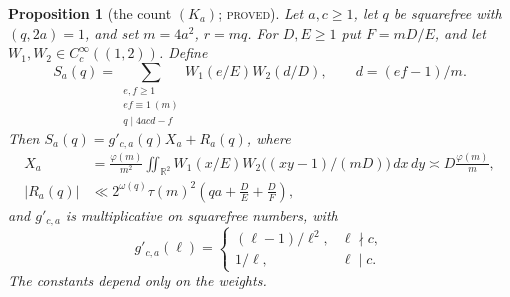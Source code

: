 \documentclass[10pt,reqno]{amsart}
\newtheorem{proposition}[theorem]{Proposition}
\theoremstyle{definition}
\numberwithin{equation}{section}
\newcommand{\R}{\mathbb R}
\newcommand{\status}[1]{\textup{\textsc{#1}}}
\begin{document}
\begin{proposition}[the count $(K_a)$; \status{proved}]\label{L:7.1}
Let $a,c\geq1$, let $q$ be squarefree with $(q,2a)=1$, and set
$m=4a^2$, $r=mq$.  For $D,E\geq1$ put $F=mD/E$, and let
$W_1,W_2\in C_c^\infty((1,2))$.  Define
\[
 S_a(q)=\sum_{\substack{e,f\geq1\\ef\equiv1\ (m)\\q\mid4acd-f}}
 W_1(e/E)W_2(d/D),\qquad d=(ef-1)/m.
\]
Then $S_a(q)=g'_{c,a}(q)X_a+R_a(q)$, where
\begin{align}
 X_a&=\frac{\varphi(m)}{m^2}\iint_{\R^2}
 W_1(x/E)W_2\bigl((xy-1)/(mD)\bigr)\,dx\,dy
 \asymp D\frac{\varphi(m)}m,\label{C:eq:Ka-main}\\
 |R_a(q)|&\ll 2^{\omega(q)}\tau(m)^2
 \left(qa+\frac DE+\frac DF\right),\label{C:eq:Ka-error}
\end{align}
and $g'_{c,a}$ is multiplicative on squarefree numbers, with
\[
 g'_{c,a}(\ell)=
 \begin{cases}(\ell-1)/\ell^2,&\ell\nmid c,\\1/\ell,&\ell\mid c.
 \end{cases}
\]
The constants depend only on the weights.
\end{proposition}
\end{document}
